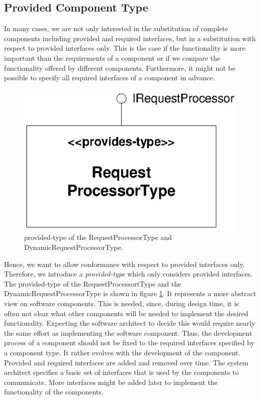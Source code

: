 \subsection{Provided Component Type}

In many cases, we are not only interested in the substitution of complete
components including provided and required interfaces, but in a substitution
with respect to provided interfaces only. This is the case if the functionality
is more important than the requirements of a component or if we compare the
functionality offered by different components. Furthermore, it might not be
possible to specify all required interfaces of a component in advance. 

\begin{figure}[htbp]
\centering
\includegraphics[scale=0.85]{example/ProvidesType}
\caption{provided-type of the RequestProcessorType and
DynamicRequestProcessorType.}
\label{fig:ProvidesType}
\end{figure}

Hence, we want to allow conformance with respect to provided interfaces only.
Therefore, we introduce a \emph{provided-type} which only considers provided
interfaces. The provided-type of the RequestProcessortType and the
DynamicRequestProcessorType is shown in figure \ref{fig:ProvidesType}. 
It represents a more abstract view on software components. This is needed,
since, during design time, it is often not clear what other components will be
needed to implement the desired functionality. Expecting the software architect
to decide this would require nearly the same effort as implementing the software
component. Thus, the development process of a component should not be fixed to
the required interfaces specified by a component type. It rather evolves with
the development of the component. Provided and required interfaces are added and
removed over time. The system architect specifies a basic set of interfaces that
is used by the components to communicate. More interfaces might be added later
to implement the functionality of the components.


